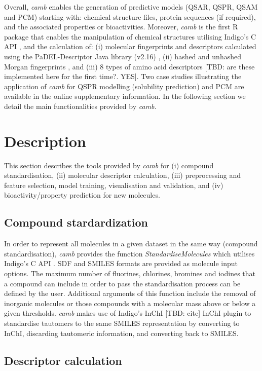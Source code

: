 \documentclass{bioinfo}
\begin{document}
Overall, {\it camb} enables the generation of predictive  models (QSAR, QSPR, QSAM and PCM)
starting with: chemical structure files, protein sequences (if required), and the associated properties or bioactivities.
Moreover, {\it camb} is the first R package that enables the manipulation of chemical structures utilising Indigo's C API \citep{Indigo},
and the calculation of:
(i) molecular fingerprints and descriptors calculated using the PaDEL-Descriptor Java library (v2.16) \citep{padel},
(ii) hashed and unhashed Morgan fingerprints \citep{extended_fp},
and (iii) 8 types of amino acid descriptors [TBD: are these implemented here for the first time?. YES]. 
Two case studies illustrating the application of {\it camb} for
QSPR modelling (solubility prediction) and PCM are available in the online supplementary information.
In the following section we detail the main functionalities provided by {\it camb}. 

\section{Description}
This section describes the tools provided by {\it camb} 
for (i) compound standardisation, (ii) molecular descriptor calculation, 
(iii) preprocessing and feature selection, model training, visualisation and validation, and (iv) bioactivity/property prediction for new molecules.	

\subsection{Compound stardardization}

In order to represent all molecules in a given dataset in the same 
way (compound standardisation),
{\it camb}  provides the function {\it StandardiseMolecules} which utilises Indigo's C API \citep{Indigo}.
SDF and SMILES formats are provided as molecule input options.
The maximum number of fluorines, chlorines, bromines and iodines
that a compound can include in order to pass the standardisation process can be defined by the user.
Additional arguments of this function include the removal of inorganic molecules
or those compounds with a molecular mass above or below a given thresholds.
{\it camb} makes use of Indigo's InChI [TBD: cite] InChI plugin to standardise tautomers to the same SMILES representation
by converting to InChI, discarding tautomeric information, and converting back to SMILES.

\subsection{Descriptor calculation} 
\end{document}

